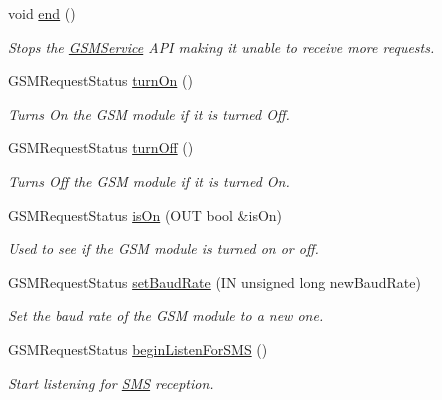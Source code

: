 \begin{DoxyCompactItemize}
\mbox{\label{class_easyuino_1_1_g_s_m_service_a05bef783773776ec209608aa81d1ff45}} 
void \hyperlink{class_easyuino_1_1_g_s_m_service_a05bef783773776ec209608aa81d1ff45}{end} ()
\begin{DoxyCompactList}\small\item\em Stops the \hyperlink{class_easyuino_1_1_g_s_m_service}{G\+S\+M\+Service} A\+PI making it unable to receive more requests. \end{DoxyCompactList}\item 
G\+S\+M\+Request\+Status \hyperlink{class_easyuino_1_1_g_s_m_service_ad5bd54c7dfcc402df0fac92c88e07c6e}{turn\+On} ()
\begin{DoxyCompactList}\small\item\em Turns On the G\+SM module if it is turned Off. \end{DoxyCompactList}\item 
G\+S\+M\+Request\+Status \hyperlink{class_easyuino_1_1_g_s_m_service_a327c2610c2aa7ba5a54530d87a0d6128}{turn\+Off} ()
\begin{DoxyCompactList}\small\item\em Turns Off the G\+SM module if it is turned On. \end{DoxyCompactList}\item 
G\+S\+M\+Request\+Status \hyperlink{class_easyuino_1_1_g_s_m_service_a3595ff12b6e3e5854ed48625b2fa457e}{is\+On} (O\+UT bool \&is\+On)
\begin{DoxyCompactList}\small\item\em Used to see if the G\+SM module is turned on or off. \end{DoxyCompactList}\item 
G\+S\+M\+Request\+Status \hyperlink{class_easyuino_1_1_g_s_m_service_a6b6ee723ceaf62bfd9312278b5dbf36d}{set\+Baud\+Rate} (IN unsigned long new\+Baud\+Rate)
\begin{DoxyCompactList}\small\item\em Set the baud rate of the G\+SM module to a new one. \end{DoxyCompactList}\item 
G\+S\+M\+Request\+Status \hyperlink{class_easyuino_1_1_g_s_m_service_a8fd764ef215a16f676e6e5e4b283b61d}{begin\+Listen\+For\+S\+MS} ()
\begin{DoxyCompactList}\small\item\em Start listening for \hyperlink{class_easyuino_1_1_s_m_s}{S\+MS} reception. \end{DoxyCompactList}\item 

\end{DoxyCompactItemize}
